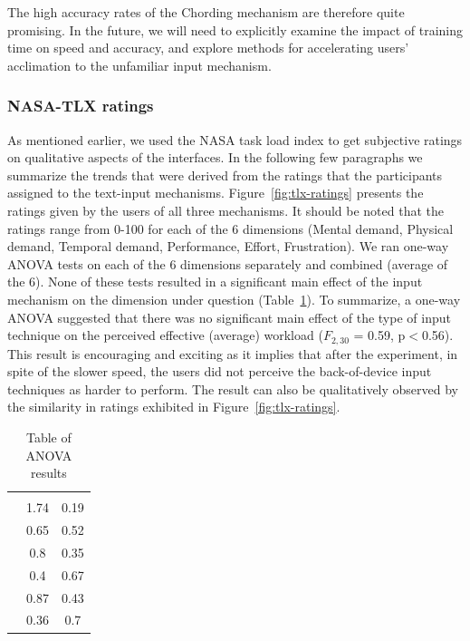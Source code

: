 The high accuracy rates of the Chording mechanism are therefore quite promising.  In the future, we will need to explicitly examine the impact of training time on speed and accuracy, and explore methods for accelerating users' acclimation to the unfamiliar input mechanism.

\subsubsection{NASA-TLX ratings}

As mentioned earlier, we used the NASA task load index to get subjective ratings on qualitative aspects of the interfaces. In the following few paragraphs we summarize the trends that were derived from the ratings that the participants assigned to the text-input mechanisms. Figure~\ref{fig:tlx-ratings} presents the ratings given by the users of all three mechanisms. It should be noted that the ratings range from 0-100 for each of the 6 dimensions (Mental demand, Physical demand, Temporal demand, Performance, Effort, Frustration). We ran one-way ANOVA tests on each of the 6 dimensions separately and combined (average of the 6). None of these tests resulted in a significant main effect of the input mechanism on the dimension under question (Table~\ref{tab:anova}). To summarize, a one-way ANOVA suggested that there was no significant main effect of the type of input technique on the perceived effective (average) workload ($F_{2,30}$ = 0.59, p$<$0.56). This result is encouraging and exciting as it implies that after the experiment, in spite of the slower speed, the users did not perceive the back-of-device input techniques as harder to perform. The result can also be qualitatively observed by the similarity in ratings exhibited in Figure~\ref{fig:tlx-ratings}.

\begin{table}
	\centering
		\begin{tabular}{rcc} 
		                         & \color{grey}{$F_{2,30}$}    & \color{grey}{p-value ($<$)} \\ 
                   \color{grey}{Mental Demand} & 1.74   & 0.19 \\ 
                   \color{grey}{Physical demand} &  0.65 & 0.52 \\ 
                   \color{grey}{Temporal demand} & 0.8 & 0.35 \\ 
                   \color{grey}{Performance} & 0.4 & 0.67 \\ 
                   \color{grey}{Effort} & 0.87 & 0.43 \\ 
                   \color{grey}{Frustration} & 0.36 & 0.7 \\ 
		\end{tabular}
	\caption{Table of ANOVA results}
	\label{tab:anova}
\end{table}


